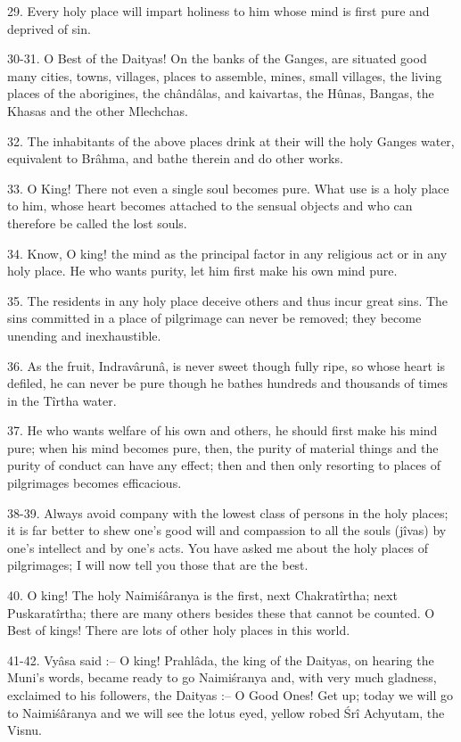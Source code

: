 29. Every holy place will impart holiness to him whose mind is first pure and deprived of sin.

30-31. O Best of the Daityas! On the banks of the Ganges, are situated good many cities, towns, villages, places to assemble, mines, small villages, the living places of the aborigines, the ch\^and\^alas, and kaivartas, the Hûnas, Bangas, the Khasas and the other Mlechchas.

32. The inhabitants of the above places drink at their will the holy Ganges water, equivalent to Br\^ahma, and bathe therein and do other works.

33. O King! There not even a single soul becomes pure. What use is a holy place to him, whose heart becomes attached to the sensual objects and who can therefore be called the lost souls.

34. Know, O king! the mind as the principal factor in any religious act or in any holy place. He who wants purity, let him first make his own mind pure.

35. The residents in any holy place deceive others and thus incur great sins. The sins committed in a place of pilgrimage can never be removed; they become unending and inexhaustible.

36. As the fruit, Indrav\^arun\^a, is never sweet though fully ripe, so whose heart is defiled, he can never be pure though he bathes hundreds and thousands of times in the T\^irtha water.

37. He who wants welfare of his own and others, he should first make his mind pure; when his mind becomes pure, then, the purity of material things and the purity of conduct can have any effect; then and then only resorting to places of pilgrimages becomes efficacious.

38-39. Always avoid company with the lowest class of persons in the holy places; it is far better to shew one's good will and compassion to all the souls (j\^ivas) by one's intellect and by one's acts. You have asked me about the holy places of pilgrimages; I will now tell you those that are the best.

40. O king! The holy Naimi\'s\^aranya is the first, next Chakrat\^irtha; next Puskarat\^irtha; there are many others besides these that cannot be counted. O Best of kings! There are lots of other holy places in this world.

41-42. Vy\^asa said :-- O king! Prahl\^ada, the king of the Daityas, on hearing the Muni's words, became ready to go Naimi\'sranya and, with very much gladness, exclaimed to his followers, the Daityas :-- O Good Ones! Get up; today we will go to Naimi\'s\^aranya and we will see the lotus eyed, yellow robed \'Sr\^i Achyutam, the Visnu.

